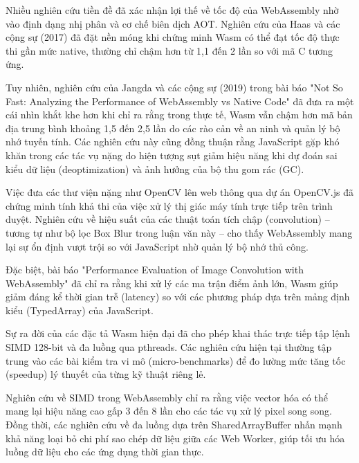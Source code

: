 Nhiều nghiên cứu tiền đề đã xác nhận lợi thế về tốc độ của WebAssembly nhờ vào định dạng nhị phân và cơ chế biên dịch AOT. Nghiên cứu của Haas và các cộng sự (2017) đã đặt nền móng khi chứng minh Wasm có thể đạt tốc độ thực thi gần mức native, thường chỉ chậm hơn từ 1,1 đến 2 lần so với mã C tương ứng.


Tuy nhiên, nghiên cứu của Jangda và các cộng sự (2019) trong bài báo "Not So Fast: Analyzing the Performance of WebAssembly vs Native Code" đã đưa ra một cái nhìn khắt khe hơn khi chỉ ra rằng trong thực tế, Wasm vẫn chậm hơn mã bản địa trung bình khoảng 1,5 đến 2,5 lần do các rào cản về an ninh và quản lý bộ nhớ tuyến tính. Các nghiên cứu này cũng đồng thuận rằng JavaScript gặp khó khăn trong các tác vụ nặng do hiện tượng sụt giảm hiệu năng khi dự đoán sai kiểu dữ liệu (deoptimization) và ảnh hưởng của bộ thu gom rác (GC).



Việc đưa các thư viện nặng như OpenCV lên web thông qua dự án OpenCV.js đã chứng minh tính khả thi của việc xử lý thị giác máy tính trực tiếp trên trình duyệt. Nghiên cứu về hiệu suất của các thuật toán tích chập (convolution) – tương tự như bộ lọc Box Blur trong luận văn này – cho thấy WebAssembly mang lại sự ổn định vượt trội so với JavaScript nhờ quản lý bộ nhớ thủ công.


Đặc biệt, bài báo "Performance Evaluation of Image Convolution with WebAssembly" đã chỉ ra rằng khi xử lý các ma trận điểm ảnh lớn, Wasm giúp giảm đáng kể thời gian trễ (latency) so với các phương pháp dựa trên mảng định kiểu (TypedArray) của JavaScript.



Sự ra đời của các đặc tả Wasm hiện đại đã cho phép khai thác trực tiếp tập lệnh SIMD 128-bit và đa luồng qua pthreads. Các nghiên cứu hiện tại thường tập trung vào các bài kiểm tra vi mô (micro-benchmarks) để đo lường mức tăng tốc (speedup) lý thuyết của từng kỹ thuật riêng lẻ.


Nghiên cứu về SIMD trong WebAssembly chỉ ra rằng việc vector hóa có thể mang lại hiệu năng cao gấp 3 đến 8 lần cho các tác vụ xử lý pixel song song. Đồng thời, các nghiên cứu về đa luồng dựa trên SharedArrayBuffer nhấn mạnh khả năng loại bỏ chi phí sao chép dữ liệu giữa các Web Worker, giúp tối ưu hóa luồng dữ liệu cho các ứng dụng thời gian thực.


